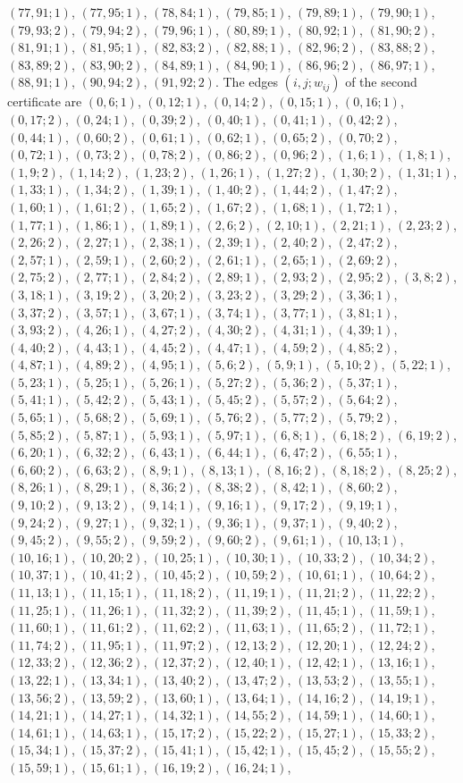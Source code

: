 \documentclass[11pt]{article}
\begin{document}
$(77,91;1)$, $(77,95;1)$, $(78,84;1)$, $(79,85;1)$, $(79,89;1)$, $(79,90;1)$, $(79,93;2)$, $(79,94;2)$, $(79,96;1)$, $(80,89;1)$, $(80,92;1)$, $(81,90;2)$, $(81,91;1)$, $(81,95;1)$, $(82,83;2)$, $(82,88;1)$, $(82,96;2)$, $(83,88;2)$, $(83,89;2)$, $(83,90;2)$, $(84,89;1)$, $(84,90;1)$, $(86,96;2)$, $(86,97;1)$, $(88,91;1)$, $(90,94;2)$, $(91,92;2)$.
The edges $(i,j;w_{ij})$ of the second certificate are $(0,6;1)$, $(0,12;1)$, $(0,14;2)$, $(0,15;1)$, $(0,16;1)$, $(0,17;2)$, $(0,24;1)$, $(0,39;2)$, $(0,40;1)$, $(0,41;1)$, $(0,42;2)$, $(0,44;1)$, $(0,60;2)$, $(0,61;1)$, $(0,62;1)$, $(0,65;2)$, $(0,70;2)$, $(0,72;1)$, $(0,73;2)$, $(0,78;2)$, $(0,86;2)$, $(0,96;2)$, $(1,6;1)$, $(1,8;1)$, $(1,9;2)$, $(1,14;2)$, $(1,23;2)$, $(1,26;1)$, $(1,27;2)$, $(1,30;2)$, $(1,31;1)$, $(1,33;1)$, $(1,34;2)$, $(1,39;1)$, $(1,40;2)$, $(1,44;2)$, $(1,47;2)$, $(1,60;1)$, $(1,61;2)$, $(1,65;2)$, $(1,67;2)$, $(1,68;1)$, $(1,72;1)$, $(1,77;1)$, $(1,86;1)$, $(1,89;1)$, $(2,6;2)$, $(2,10;1)$, $(2,21;1)$, $(2,23;2)$, $(2,26;2)$, $(2,27;1)$, $(2,38;1)$, $(2,39;1)$, $(2,40;2)$, $(2,47;2)$, $(2,57;1)$, $(2,59;1)$, $(2,60;2)$, $(2,61;1)$, $(2,65;1)$, $(2,69;2)$, $(2,75;2)$, $(2,77;1)$, $(2,84;2)$, $(2,89;1)$, $(2,93;2)$, $(2,95;2)$, $(3,8;2)$, $(3,18;1)$, $(3,19;2)$, $(3,20;2)$, $(3,23;2)$, $(3,29;2)$, $(3,36;1)$, $(3,37;2)$, $(3,57;1)$, $(3,67;1)$, $(3,74;1)$, $(3,77;1)$, $(3,81;1)$, $(3,93;2)$, $(4,26;1)$, $(4,27;2)$, $(4,30;2)$, $(4,31;1)$, $(4,39;1)$, $(4,40;2)$, $(4,43;1)$, $(4,45;2)$, $(4,47;1)$, $(4,59;2)$, $(4,85;2)$, $(4,87;1)$, $(4,89;2)$, $(4,95;1)$, $(5,6;2)$, $(5,9;1)$, $(5,10;2)$, $(5,22;1)$, $(5,23;1)$, $(5,25;1)$, $(5,26;1)$, $(5,27;2)$, $(5,36;2)$, $(5,37;1)$, $(5,41;1)$, $(5,42;2)$, $(5,43;1)$, $(5,45;2)$, $(5,57;2)$, $(5,64;2)$, $(5,65;1)$, $(5,68;2)$, $(5,69;1)$, $(5,76;2)$, $(5,77;2)$, $(5,79;2)$, $(5,85;2)$, $(5,87;1)$, $(5,93;1)$, $(5,97;1)$, $(6,8;1)$, $(6,18;2)$, $(6,19;2)$, $(6,20;1)$, $(6,32;2)$, $(6,43;1)$, $(6,44;1)$, $(6,47;2)$, $(6,55;1)$, $(6,60;2)$, $(6,63;2)$, $(8,9;1)$, $(8,13;1)$, $(8,16;2)$, $(8,18;2)$, $(8,25;2)$, $(8,26;1)$, $(8,29;1)$, $(8,36;2)$, $(8,38;2)$, $(8,42;1)$, $(8,60;2)$, $(9,10;2)$, $(9,13;2)$, $(9,14;1)$, $(9,16;1)$, $(9,17;2)$, $(9,19;1)$, $(9,24;2)$, $(9,27;1)$, $(9,32;1)$, $(9,36;1)$, $(9,37;1)$, $(9,40;2)$, $(9,45;2)$, $(9,55;2)$, $(9,59;2)$, $(9,60;2)$, $(9,61;1)$, $(10,13;1)$, $(10,16;1)$, $(10,20;2)$, $(10,25;1)$, $(10,30;1)$, $(10,33;2)$, $(10,34;2)$, $(10,37;1)$, $(10,41;2)$, $(10,45;2)$, $(10,59;2)$, $(10,61;1)$, $(10,64;2)$, $(11,13;1)$, $(11,15;1)$, $(11,18;2)$, $(11,19;1)$, $(11,21;2)$, $(11,22;2)$, $(11,25;1)$, $(11,26;1)$, $(11,32;2)$, $(11,39;2)$, $(11,45;1)$, $(11,59;1)$, $(11,60;1)$, $(11,61;2)$, $(11,62;2)$, $(11,63;1)$, $(11,65;2)$, $(11,72;1)$, $(11,74;2)$, $(11,95;1)$, $(11,97;2)$, $(12,13;2)$, $(12,20;1)$, $(12,24;2)$, $(12,33;2)$, $(12,36;2)$, $(12,37;2)$, $(12,40;1)$, $(12,42;1)$, $(13,16;1)$, $(13,22;1)$, $(13,34;1)$, $(13,40;2)$, $(13,47;2)$, $(13,53;2)$, $(13,55;1)$, $(13,56;2)$, $(13,59;2)$, $(13,60;1)$, $(13,64;1)$, $(14,16;2)$, $(14,19;1)$, $(14,21;1)$, $(14,27;1)$, $(14,32;1)$, $(14,55;2)$, $(14,59;1)$, $(14,60;1)$, $(14,61;1)$, $(14,63;1)$, $(15,17;2)$, $(15,22;2)$, $(15,27;1)$, $(15,33;2)$, $(15,34;1)$, $(15,37;2)$, $(15,41;1)$, $(15,42;1)$, $(15,45;2)$, $(15,55;2)$, $(15,59;1)$, $(15,61;1)$, $(16,19;2)$, $(16,24;1)$, 
\end{document}
